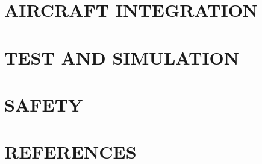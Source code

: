 \documentclass[12pt]{article}
\begin{document}
\section{AIRCRAFT INTEGRATION}

\section{TEST AND SIMULATION}

\section{SAFETY}

\section{REFERENCES}

\singlespacing
 

\end{document}
